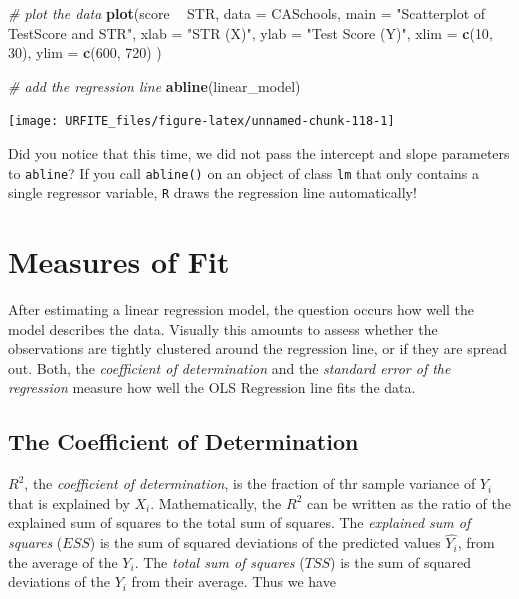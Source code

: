 \documentclass[]{book}
\newenvironment{Shaded}{\begin{snugshade}}{\end{snugshade}}
\newcommand{\KeywordTok}[1]{\textcolor[rgb]{0.13,0.29,0.53}{\textbf{#1}}}
\newcommand{\DataTypeTok}[1]{\textcolor[rgb]{0.13,0.29,0.53}{#1}}
\newcommand{\DecValTok}[1]{\textcolor[rgb]{0.00,0.00,0.81}{#1}}
\newcommand{\StringTok}[1]{\textcolor[rgb]{0.31,0.60,0.02}{#1}}
\newcommand{\CommentTok}[1]{\textcolor[rgb]{0.56,0.35,0.01}{\textit{#1}}}
\newcommand{\OperatorTok}[1]{\textcolor[rgb]{0.81,0.36,0.00}{\textbf{#1}}}
\newcommand{\NormalTok}[1]{#1}
\theoremstyle{definition}
\theoremstyle{definition}
\theoremstyle{definition}
\theoremstyle{remark}
\begin{document}
\begin{Shaded}
\begin{Highlighting}[]
\CommentTok{# plot the data}
\KeywordTok{plot}\NormalTok{(score }\OperatorTok{~}\StringTok{ }\NormalTok{STR, }
     \DataTypeTok{data =}\NormalTok{ CASchools,}
     \DataTypeTok{main =} \StringTok{"Scatterplot of TestScore and STR"}\NormalTok{, }
     \DataTypeTok{xlab =} \StringTok{"STR (X)"}\NormalTok{,}
     \DataTypeTok{ylab =} \StringTok{"Test Score (Y)"}\NormalTok{,}
     \DataTypeTok{xlim =} \KeywordTok{c}\NormalTok{(}\DecValTok{10}\NormalTok{, }\DecValTok{30}\NormalTok{),}
     \DataTypeTok{ylim =} \KeywordTok{c}\NormalTok{(}\DecValTok{600}\NormalTok{, }\DecValTok{720}\NormalTok{)}
\NormalTok{     )}

\CommentTok{# add the regression line}
\KeywordTok{abline}\NormalTok{(linear_model) }
\end{Highlighting}
\end{Shaded}

\begin{center}\texttt{[image: URFITE\_files/figure-latex/unnamed-chunk-118-1]} \end{center}

Did you notice that this time, we did not pass the intercept and slope
parameters to \texttt{abline}? If you call \texttt{abline()} on an
object of class \texttt{lm} that only contains a single regressor
variable, \texttt{R} draws the regression line automatically!

\section{Measures of Fit}\label{measures-of-fit}

After estimating a linear regression model, the question occurs how well
the model describes the data. Visually this amounts to assess whether
the observations are tightly clustered around the regression line, or if
they are spread out. Both, the \emph{coefficient of determination} and
the \emph{standard error of the regression} measure how well the OLS
Regression line fits the data.

\subsection*{The Coefficient of
Determination}\label{the-coefficient-of-determination}

\(R^2\), the \emph{coefficient of determination}, is the fraction of thr
sample variance of \(Y_i\) that is explained by \(X_i\). Mathematically,
the \(R^2\) can be written as the ratio of the explained sum of squares
to the total sum of squares. The \emph{explained sum of squares}
(\(ESS\)) is the sum of squared deviations of the predicted values
\(\hat{Y_i}\), from the average of the \(Y_i\). The \emph{total sum of
squares} (\(TSS\)) is the sum of squared deviations of the \(Y_i\) from
their average. Thus we have
\end{document}
